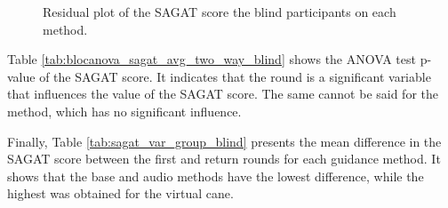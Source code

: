 \begin{figure}[!htb]
\begin{minipage}{0.45\textwidth}
        \caption{Residual plot of the SAGAT score the blind participants on each method.}
        \label{fig:residplot_sagat_avg_two_way_blind}
    \end{minipage}
\end{figure}

Table \ref{tab:blocanova_sagat_avg_two_way_blind} shows the ANOVA test p-value of the SAGAT score. It indicates that the round is a significant variable that influences the value of the SAGAT score. The same cannot be said for the method, which has no significant influence.



Finally, Table \ref{tab:sagat_var_group_blind} presents the mean difference in the SAGAT score between the first and return rounds for each guidance method. It shows that the base and audio methods have the lowest difference, while the highest was obtained for the virtual cane.



\FloatBarrier